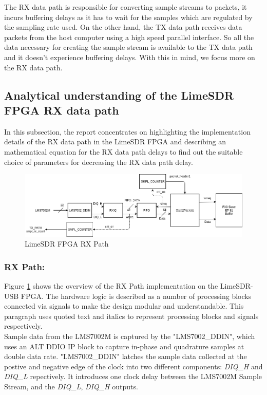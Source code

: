 The RX data path is responsible for converting sample streams to packets, it incurs buffering delays as it has to wait for the samples which are regulated by the sampling rate used.
On the other hand, the TX data path receives data packets from the host computer using a high speed parallel interface.
So all the data necessary for creating the sample stream is available to the TX data path and it doesn't experience buffering delays.
With this in mind, we focus more on the RX data path.


\subsection{Analytical understanding of the LimeSDR FPGA RX data path}
In this subsection, the report concentrates on highlighting the implementation details of the RX data path in the LimeSDR FPGA and describing an mathematical equation for the RX data path delays to find out the suitable choice of parameters for decreasing the RX data path delay.

\begin{figure}[h!]
\centering
\includegraphics[width=\textwidth]{Figure/DATA2PACKETS.png}
\caption{LimeSDR FPGA RX Path}
\label{RX_Path}
\end{figure}

\subsubsection{RX Path:}

Figure \ref{RX_Path} shows the overview of the RX Path implementation on the LimeSDR-USB \ac{FPGA}.
The hardware logic is described as a number of processing blocks connected via signals to make the design modular and understandable.
This paragraph uses quoted text and italics to represent processing blocks and signals respectively.\\

Sample data from the LMS7002M is captured by the "LMS7002\_DDIN", which uses an ALT DDIO IP \cite{noauthor_double_nodate} block to capture in-phase and quadrature samples at double data rate.
"LMS7002\_DDIN" latches the sample data collected at the postive and negative edge of the clock into two different components: \textit{DIQ\_H} and \textit{DIQ\_L} repectively.
It introduces one clock delay between the LMS7002M Sample Stream, and the \textit{DIQ\_L}, \textit{DIQ\_H} outputs.\\


